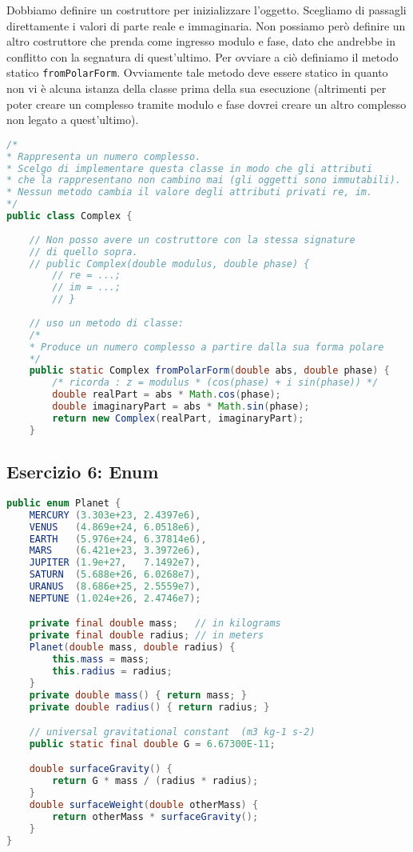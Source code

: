 \documentclass{article}
\begin{document}
Dobbiamo definire un costruttore per inizializzare l'oggetto.
Scegliamo di passagli direttamente i valori di parte reale e immaginaria.
Non possiamo per\`o definire un altro costruttore che prenda come ingresso
modulo e fase, dato che andrebbe in conflitto con la segnatura di quest'ultimo.
Per ovviare a ciò definiamo il metodo statico \texttt{fromPolarForm}.
Ovviamente tale metodo deve essere statico in quanto non vi è
alcuna istanza della classe prima della sua esecuzione (altrimenti
per poter creare un complesso tramite modulo e fase dovrei creare un altro complesso
non legato a quest'ultimo).
\begin{lstlisting}[language=Java,escapechar=|]
/*
* Rappresenta un numero complesso.
* Scelgo di implementare questa classe in modo che gli attributi
* che la rappresentano non cambino mai (gli oggetti sono immutabili).
* Nessun metodo cambia il valore degli attributi privati re, im.
*/
public class Complex {
	
	// Non posso avere un costruttore con la stessa signature
	// di quello sopra.
	// public Complex(double modulus, double phase) {
		// re = ...;
		// im = ...;
		// }
	
	// uso un metodo di classe:
	/*
	* Produce un numero complesso a partire dalla sua forma polare
	*/
	public static Complex fromPolarForm(double abs, double phase) {
		/* ricorda : z = modulus * (cos(phase) + i sin(phase)) */
		double realPart = abs * Math.cos(phase);
		double imaginaryPart = abs * Math.sin(phase);
		return new Complex(realPart, imaginaryPart);
	}
\end{lstlisting}

\subsection{Esercizio 6: Enum}
\begin{lstlisting}[language=Java,escapechar=|]
public enum Planet {
    MERCURY (3.303e+23, 2.4397e6),
    VENUS   (4.869e+24, 6.0518e6),
    EARTH   (5.976e+24, 6.37814e6),
    MARS    (6.421e+23, 3.3972e6),
    JUPITER (1.9e+27,   7.1492e7),
    SATURN  (5.688e+26, 6.0268e7),
    URANUS  (8.686e+25, 2.5559e7),
    NEPTUNE (1.024e+26, 2.4746e7);

    private final double mass;   // in kilograms
    private final double radius; // in meters
    Planet(double mass, double radius) {
        this.mass = mass;
        this.radius = radius;
    }
    private double mass() { return mass; }
    private double radius() { return radius; }

    // universal gravitational constant  (m3 kg-1 s-2)
    public static final double G = 6.67300E-11;

    double surfaceGravity() {
        return G * mass / (radius * radius);
    }
    double surfaceWeight(double otherMass) {
        return otherMass * surfaceGravity();
    }
}
\end{lstlisting}
\end{document}
